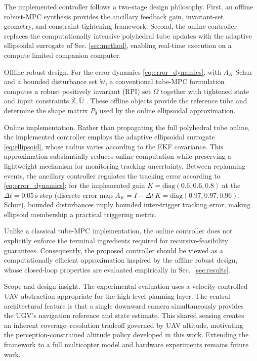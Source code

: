 \documentclass[letterpaper, 10 pt, conference]{ieeeconf}  %
\begin{document}
The implemented controller follows a two-stage design philosophy. First, an offline robust-MPC
synthesis provides the ancillary feedback gain, invariant-set geometry, and constraint-tightening
framework. Second, the online controller replaces the computationally intensive polyhedral tube
updates with the adaptive ellipsoidal surrogate of
Sec. \ref{sec:method}, enabling real-time execution on a compute limited companion computer. 

 {Offline robust design.}
For the error dynamics \eqref{eq:error_dynamics}, with $A_K$ Schur and a bounded disturbance set
$\mathbb{W}$, a conventional tube-MPC formulation computes a robust positively invariant (RPI) set
$\Omega$ together with tightened state and input constraints
$\bar{\mathbb{X}},\bar{\mathbb{U}}$
\cite{mayne2005robust,mRPI}. These offline objects provide the reference tube and determine the
shape matrix $P_0$ used by the online ellipsoidal approximation.

 {Online implementation.}
Rather than propagating the full polyhedral tube online, the implemented controller employs the
adaptive ellipsoidal surrogate \eqref{eq:ellipsoid}, whose radius varies according to the EKF
covariance. This approximation substantially reduces online computation while preserving a
lightweight mechanism for monitoring tracking uncertainty. Between replanning events, the
ancillary controller regulates the tracking error according to
\eqref{eq:error_dynamics}; for the implemented gain $K=\mathrm{diag}(0.6,0.6,0.8)$ at the
$\Delta t{=}0.05$\,s step (discrete error map $A_K=I-\Delta t\,K=\mathrm{diag}(0.97,0.97,0.96)$,
Schur), bounded disturbances imply bounded inter-trigger tracking error, making ellipsoid
membership a practical triggering metric.

Unlike a classical tube-MPC implementation, the online controller does not explicitly enforce the
terminal ingredients required for recursive-feasibility guarantees. Consequently, the proposed
controller should be viewed as a computationally efficient approximation inspired by the offline
robust design, whose closed-loop properties are evaluated empirically in Sec.~\ref{sec:results}.

 {Scope and design insight.}
The experimental evaluation uses a velocity-controlled UAV abstraction appropriate for the
high-level planning layer. The central architectural feature is that a single downward camera
simultaneously provides the UGV's navigation reference and state estimate. This shared sensing
creates an inherent coverage--resolution tradeoff governed by UAV altitude, motivating the
perception-constrained altitude policy developed in this work. Extending the framework to a full
multicopter model and hardware experiments remains future work.
\end{document}

